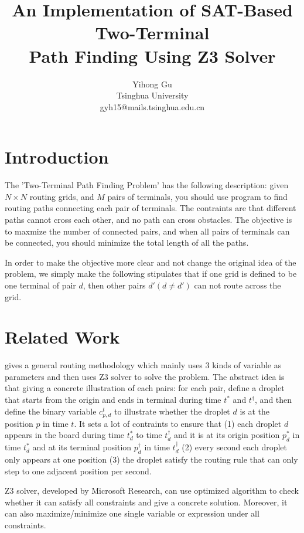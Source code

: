 \documentclass[twocolumn]{article}
\title{\textbf{An Implementation of SAT-Based Two-Terminal \\ Path Finding Using Z3 Solver}}
\author{Yihong Gu \\ Tsinghua University \\ gyh15@mails.tsinghua.edu.cn}
\date{}
\begin{document}
\maketitle

\section{Introduction}

The 'Two-Terminal Path Finding Problem' has the following description: given $N \times N$ routing grids, and $M$ pairs of terminals, you should use program to find routing paths connecting each pair of terminals. The contraints are that different paths cannot cross each other, and no path can cross obstacles. The objective is to maxmize the number of connected pairs, and when all pairs of terminals can be connected, you should minimize the total length of all the paths.

In order to make the objective more clear and not change the original idea of the problem, we simply make the following stipulates that if one grid is defined to be one terminal of pair $d$, then other pairs $d'(d \neq d')$ can not route across the grid.

\section{Related Work}

\cite{source1} gives a general routing methodology which mainly uses 3 kinds of variable as parameters and then uses Z3 solver to solve the problem. The abstract idea is that giving a concrete illustration of each pairs: for each pair, define a droplet that starts from the origin and ends in terminal during time $t^*$ and $t^\dagger$, and then define the binary variable $c_{p,d}^t$ to illustrate whether the droplet $d$ is at the position $p$ in time $t$. It sets a lot of contraints to ensure that (1) each droplet $d$ appears in the board during time $t^*_d$ to time $t^\dagger_d$ and it is at its origin position $p^*_d$ in time $t^*_d$ and at its terminal position $p^\dagger_d$ in time $t^\dagger_d$ (2) every second each droplet only appears at one position (3) the droplet satisfy the routing rule that can only step to one adjacent position per second.

Z3 solver\cite{source2}, developed by Microsoft Research, can use optimized algorithm to check whether it can satisfy all constraints and give a concrete solution. Moreover, it can also maximize/minimize one single variable or expression under all constraints.
\end{document}
